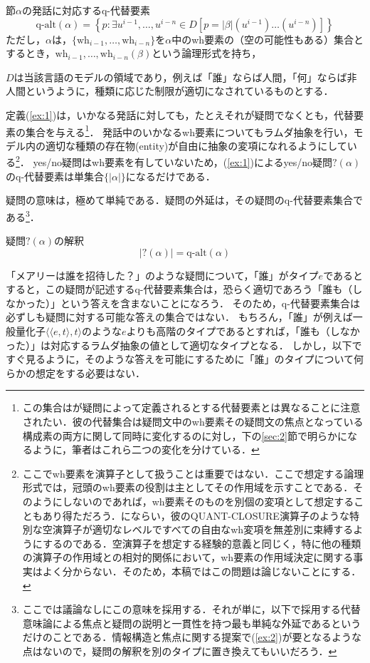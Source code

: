 \documentclass{goken}
\newcommand{\ori}[1]{\noindent\textcolor[gray]{0.7}{\fontsize{8pt}{8pt}\selectfont{\textsf{(p.~#1)}}} }
\begin{document}
\begin{exe}
	\ex\label{ex:1}
	節$\alpha$の発話に対応する\textsf{q-代替要素}
	\[
		\text{q-alt}(\alpha) = \left\{p: \exists u^{i-1}, \dots, u^{i-n} \in D \left[p = |\beta|\left(u^{i-1}\right) \dots \left(u^{i-n}\right)\right]\right\}
	\]
	ただし，$\alpha$は，$\{\text{wh}_{i-1}, \dots, \text{wh}_{i-n}\}$を$\alpha$中のwh要素の（空の可能性もある）集合とするとき，$\text{wh}_{i-1}, \dots, \text{wh}_{i-n}(\beta)$という論理形式を持ち，

	$D$は当該言語のモデルの領域であり，例えば「誰」ならば人間，「何」ならば非人間というように，種類に応じた制限が適切になされているものとする．
\end{exe}
\noindent
定義(\ref{ex:1})は，いかなる発話に対しても，たとえそれが疑問でなくとも，代替要素の集合を与える\footnote{この集合は\citet{vonStechow1991}が疑問によって定義されるとする代替要素とは異なることに注意されたい．彼の代替集合は疑問文中のwh要素その疑問文の焦点となっている構成素の両方に関して同時に変化するのに対し，下の\ref{sec:2}節で明らかになるように，筆者はこれら二つの変化を分けている．}．
発話中のいかなるwh要素についてもラムダ抽象を行い，モデル内の適切な種類の存在物(entity)が自由に抽象の変項になれるようにしている\footnote{ここでwh要素を演算子として扱うことは重要ではない．ここで想定する論理形式では，冠頭のwh要素の役割は主としてその作用域を示すことである．そのようにしないのであれば，wh要素そのものを別個の変項として想定することもあり得ただろう．\citealt{Ginzburg1995a, Ginzburg1995b}にならい，彼のQUANT-CLOSURE演算子のような特別な空演算子が適切なレベルですべての自由なwh変項を無差別に束縛するようにするのである．空演算子を想定する経験的意義と同じく，特に他の種類の演算子の作用域との相対的関係において，wh要素の作用域決定に関する事実はよく分からない．そのため，本稿ではこの問題は論じないことにする．}．
yes/no疑問はwh要素を有していないため，(\ref{ex:1})によるyes/no疑問$?(\alpha)$のq-代替要素は単集合$\{|\alpha|\}$になるだけである．

疑問の意味は，極めて単純である．疑問の外延は，その疑問のq-代替要素集合である\footnote{ここでは議論なしにこの意味を採用する．それが単に，以下で採用する代替意味論による焦点と疑問の説明と一貫性を持つ最も単純な外延であるというだけのことである．情報構造と焦点に関する提案で(\ref{ex:2})が要となるような点はないので，疑問の解釈を別のタイプに置き換えてもいいだろう．}．

\ori{11}
\begin{exe}
	\ex\label{ex:2}
	\textsf{疑問$?(\alpha)$の解釈}
	\[
	|?(\alpha)| = \text{q-alt}(\alpha)\]
\end{exe}
\noindent
「メアリーは誰を招待した？」のような疑問について，「誰」がタイプ$e$であるとすると，この疑問が記述するq-代替要素集合は，恐らく適切であろう「誰も（しなかった）」という答えを含まないことになろう．%
そのため，q-代替要素集合は必ずしも疑問に対する可能な答えの集合ではない．
もちろん，「誰」が例えば一般量化子$\langle\langle e,t \rangle ,t \rangle$のような$e$よりも高階のタイプであるとすれば，「誰も（しなかった）」は対応するラムダ抽象の値として適切なタイプとなる．%
しかし，以下ですぐ見るように，そのような答えを可能にするために「誰」のタイプについて何らかの想定をする必要はない．%
\end{document}
